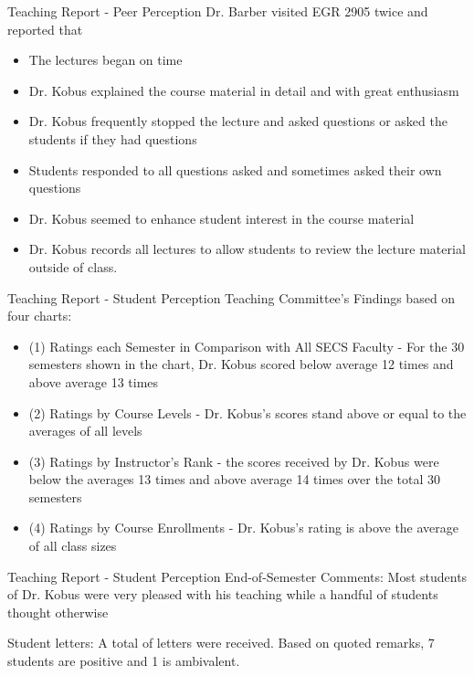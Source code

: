 \documentclass{beamer}
\begin{document}
\begin{frame}{Teaching Report - Peer Perception}
Dr. Barber visited EGR 2905 twice and reported that
\begin{itemize}
  \item The lectures began on time
  \item  Dr. Kobus explained the course material in detail and with great enthusiasm
  \item Dr. Kobus frequently stopped the lecture and asked questions or asked the students if they had questions
  \item  Students responded to all questions asked and sometimes asked their own questions
  \item  Dr. Kobus seemed to enhance student interest in the course material
  \item  Dr. Kobus records all lectures to allow students to review the lecture material outside of class.
\end{itemize}
\end{frame}

\begin{frame}{Teaching Report - Student Perception}
Teaching Committee's Findings based on four charts: 
\begin{itemize}
  \item  (1) Ratings each Semester in Comparison with All SECS Faculty -  For the 30 semesters shown in the chart, Dr. Kobus scored below average 12 times and above average 13 times
  \item (2) Ratings by Course Levels - Dr. Kobus’s scores stand above or equal to the averages of all levels 
  \item (3) Ratings by Instructor’s Rank -  the scores received by Dr. Kobus were below the averages 13 times and above average 14 times over the total 30 semesters
  \item (4) Ratings by Course Enrollments - Dr. Kobus’s rating is above the average of all class sizes
\end{itemize}

\end{frame}

\begin{frame}{Teaching Report - Student Perception}
End-of-Semester Comments: Most students of Dr. Kobus were very pleased with his teaching while a handful of students thought otherwise
\vspace{\fill}

Student letters:
A total of letters were received. Based on quoted remarks, 7 students are positive and 1 is ambivalent. 
\end{frame}
\end{document}
